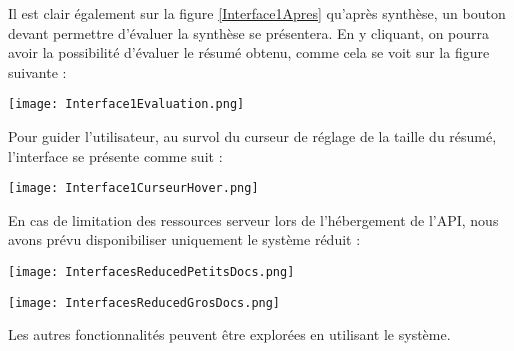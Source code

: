 Il est clair également sur la figure \ref{Interface1Apres} qu'après synthèse, un bouton devant permettre d'évaluer la synthèse se présentera. En y cliquant, on pourra avoir la possibilité d'évaluer le résumé obtenu, comme cela se voit sur la figure suivante :
\begin{center}
\texttt{[image: Interface1Evaluation.png]}
\label{Interface1Evaluation}
\end{center}
Pour guider l'utilisateur, au survol du curseur de réglage de la taille du résumé, l'interface se présente comme suit :
\begin{center}
\texttt{[image: Interface1CurseurHover.png]}
\label{Interface1CurseurHover}
\end{center}

En cas de limitation des ressources serveur lors de l'hébergement de l'API, nous avons prévu disponibiliser uniquement le système réduit :
\begin{center}
\texttt{[image: InterfacesReducedPetitsDocs.png]}
\label{InterfacesReducedPetitsDocs}
\end{center}

\begin{center}
\texttt{[image: InterfacesReducedGrosDocs.png]}
\label{InterfacesReducedGrosDocs}
\end{center}

Les autres fonctionnalités peuvent être explorées en utilisant le système.

